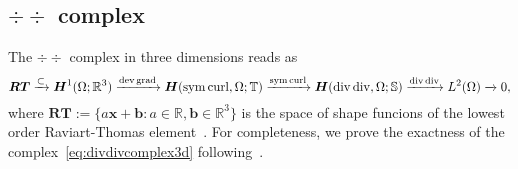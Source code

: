 \subsection{$\div\div$ complex}

The $\div\div$ complex in three dimensions reads as~\cite{ArnoldHu2020,PaulyZulehner2020}
\begin{equation}\label{eq:divdivcomplex3d}
\boldsymbol{RT}\xrightarrow{\subset} \boldsymbol H^1(\Omega;\mathbb R^3)\xrightarrow{\operatorname{dev}\operatorname{grad}}\boldsymbol H(\operatorname{sym}\operatorname{curl},\Omega;\mathbb T)\xrightarrow{\operatorname{sym}\operatorname{curl}} \boldsymbol H(\operatorname{div}\operatorname{div}, \Omega;\mathbb S) \xrightarrow{\operatorname{div}{\operatorname{div}}} L^2(\Omega)\xrightarrow{}0,
\end{equation}
where $\boldsymbol{RT}:= \{a\boldsymbol x + \boldsymbol b: a\in \mathbb R, \boldsymbol b \in \mathbb R^3\}$ is the space of shape funcions of the lowest order Raviart-Thomas element~\cite{RaviartThomas1977}.
For completeness, we prove the exactness of the complex~\eqref{eq:divdivcomplex3d} following~\cite{PaulyZulehner2020}.

